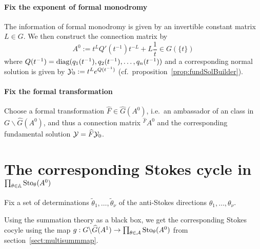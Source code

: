 \paragraph{Fix the exponent of formal monodromy}
The information of formal monodromy is given by an invertible constant matrix
$L\in G$.
We then construct the connection matrix by
\[
  A^0:=t^LQ'(t^{-1})t^{-L}+L\frac{1}{t} \in G(\!\{t\}\!)
\]
where $Q(t^{-1})=\operatorname{diag}(q_1(t^{-1}),q_2(t^{-1}),\dots,q_n(t^{-1}))$ and
a corresponding normal solution is given by $\mathcal{Y}_0:=t^Le^{Q(t^{-1})}$
(cf.\ proposition~\ref{prop:fundSolBuilder}).
\begin{comment}
  If we assume that $L$ is diagonal, we can use the commutation of diagonal
  matrices to write $A^0:=Q'(t^{-1})+L\frac{1}{t}$.
\end{comment}

\paragraph{Fix the formal transformation}
Choose a formal transformation $\hat F\in\hat G(A^0)$, i.e.\ an ambassador of
an class in $G\backslash\hat G(A^0)$, and thus a connection matrix
${}^{\hat F}\!A^0$ and the corresponding fundamental solution
$\mathcal{Y}=\widehat F\mathcal{Y}_0$.

\begin{comment}
  From the theorem~\ref{thm:summaFaktori} we know in our case, that $\hat F$
  can be factored in
  \[
    \hat F=\hat F_1 \hat F_2
  \]
  where $\hat F_j\in\hat G(A^0)$ is
  \begin{itemize}
    \item $k_j$-summable and
    \item with singular directions belonging to $\A^{k_j}$.
  \end{itemize}
  \TODO[build this way?]
\end{comment}

\section{The corresponding Stokes cycle in $\prod_{\theta\in\mathbb{A}}\operatorname{Sto}_\theta(A^0)$}
Fix a set of determinations $\tilde\theta_1,\dots,\tilde\theta_\nu$ of the
anti-Stokes directions $\theta_1 ,\dots,\theta_\nu$.

Using the summation theory as a black box, we get the corresponding Stokes
cocyle using the map $g:G\backslash\widehat G(A^1)\to
\prod_{\theta\in\mathcal{A}}\operatorname{Sto}_\theta(A^0)$ from section~\ref{sect:multisummmap}.

